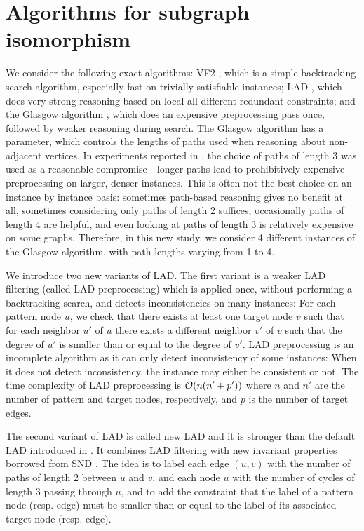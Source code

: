 \documentclass{llncs}
\begin{document}
\section{Algorithms for subgraph isomorphism}

We consider the following exact algorithms:
 VF2 \cite{Cordella:2004}, which is a simple backtracking search algorithm, especially fast on trivially satisfiable instances;
 LAD \cite{Solnon:2010}, which  does very strong reasoning based on local all different redundant constraints;
 and the Glasgow algorithm \cite{McCreesh:2015}, which does an expensive preprocessing pass once, followed by weaker reasoning during search.
 The Glasgow algorithm has a parameter, which controls the lengths of paths used when reasoning about non-adjacent vertices.  In experiments reported in \cite{McCreesh:2015}, the choice of paths of length 3 was used as a reasonable compromise---longer paths lead to prohibitively expensive preprocessing on larger, denser instances. This is
often not the best choice on an instance by instance basis: sometimes path-based reasoning gives no benefit at all, sometimes considering only paths of length 2 suffices, occasionally paths of length 4 are helpful, and even looking at paths of length 3 is relatively expensive on some graphs. Therefore, in this new study, we consider 4 different instances of the Glasgow algorithm, with path lengths varying from 1 to 4.

We introduce two new variants of LAD. The first variant is a weaker LAD filtering (called LAD preprocessing) which is applied once, without performing a backtracking search, and detects inconsistencies on many instances: For each pattern node $u$, we check that there exists at least one target node $v$ such that for each neighbor $u'$ of $u$ there exists a different neighbor $v'$ of $v$ such that the degree of $u'$ is smaller than or equal to the degree of $v'$. LAD preprocessing is an incomplete algorithm as it can only detect inconsistency of some instances: When it does not detect inconsistency, the instance may either be consistent or not. The time complexity of LAD preprocessing is ${\cal O}(n(n'+p'))$ where $n$ and $n'$ are the number of pattern and target nodes, respectively, and $p$ is the number of target edges.

The second variant of LAD is called new LAD and it is stronger than the default LAD introduced in  \cite{Solnon:2010}. It combines LAD filtering with new invariant properties borrowed from SND \cite{Audemard:2014}. The idea is to label each edge $(u,v)$ with the number of paths of length 2 between $u$ and $v$, and each node $u$ with the number of cycles of length 3 passing through $u$, and to add the constraint that the label of a pattern node (resp. edge) must be smaller than or equal to the label of its associated target node (resp. edge). 
\end{document}

